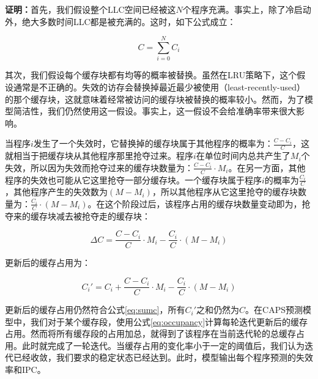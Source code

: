 \textbf{证明：}首先，我们假设整个LLC空间已经被这$N$个程序充满。事实上，除了冷启动外，绝大多数时间LLC都是被充满的。这时，如下公式成立：

\begin{equation}
C = \sum_{i=0}^{N} C_i
\label{eq:sumc}
\end{equation}

其次，我们假设每个缓存块都有均等的概率被替换。虽然在LRU策略下，这个假设通常是不正确的。失效的访存会替换掉最近最少被使用（least-recently-used）的那个缓存块，这就意味着经常被访问的缓存块被替换的概率较小。然而，为了模型简洁性，我们仍然使用这一假设。事实上，这一假设不会给准确率带来很大影响\parencite{west2010online}。

当程序$i$发生了一个失效时，它替换掉的缓存块属于其他程序的概率为：$\frac{C-C_i}{C}$，这就相当于把缓存块从其他程序那里抢夺过来。程序$i$在单位时间内总共产生了$M_i$个失效，所以因为失效而抢夺过来的缓存块数量为：$\frac{C-C_i}{C} \cdot M_i $。在另一方面，其他程序的失效也可能从它这里抢夺一部分缓存块。一个缓存块属于程序$i$的概率为$\frac{C_i}{C}$，其他程序产生的失效数为$(M-M_i)$，所以其他程序从它这里抢夺的缓存块数量为：$\frac{C_i}{C} \cdot (M-M_i)$。在这个阶段过后，该程序占用的缓存块数量变动即为，抢夺来的缓存块减去被抢夺走的缓存块：

\begin{equation}
 \Delta C = \frac{C-C_i}{C} \cdot M_i - \frac{C_i}{C} \cdot (M-M_i)
 \label{eq:deltac}
\end{equation}

更新后的缓存占用为：

\begin{equation}
 C_i' = C_i + \frac{C-C_i}{C} \cdot M_i - \frac{C_i}{C} \cdot (M-M_i)
 \label{eq:occupancy}
\end{equation}

更新后的缓存占用仍然符合公式\ref{eq:sumc}，所有$C_i'$之和仍然为$C$。在CAPS预测模型中，我们对于某个缓存段，使用公式\ref{eq:occupancy}计算每轮迭代更新后的缓存占用。然而将所有缓存段的占用加总，就得到了该程序在当前迭代轮的总缓存占用。此时就完成了一轮迭代。当缓存占用的变化率小于一定的阈值后，我们认为迭代已经收敛，我们要求的稳定状态已经达到。此时，模型输出每个程序预测的失效率和IPC。